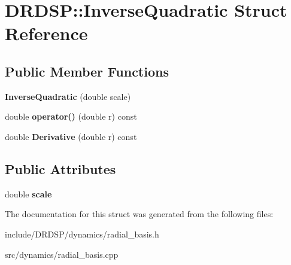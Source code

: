 \hypertarget{struct_d_r_d_s_p_1_1_inverse_quadratic}{\section{D\-R\-D\-S\-P\-:\-:Inverse\-Quadratic Struct Reference}
\label{struct_d_r_d_s_p_1_1_inverse_quadratic}
}
\subsection*{Public Member Functions}
\begin{DoxyCompactItemize}
\item 
\hypertarget{struct_d_r_d_s_p_1_1_inverse_quadratic_a4a7714fcbafbaec4bb30c6922feb59e1}{{\bfseries Inverse\-Quadratic} (double scale)}\label{struct_d_r_d_s_p_1_1_inverse_quadratic_a4a7714fcbafbaec4bb30c6922feb59e1}

\item 
\hypertarget{struct_d_r_d_s_p_1_1_inverse_quadratic_a8046e278ab0c485750ff062c6862ec87}{double {\bfseries operator()} (double r) const }\label{struct_d_r_d_s_p_1_1_inverse_quadratic_a8046e278ab0c485750ff062c6862ec87}

\item 
\hypertarget{struct_d_r_d_s_p_1_1_inverse_quadratic_a628c78a421c55898e94846eeb1865326}{double {\bfseries Derivative} (double r) const }\label{struct_d_r_d_s_p_1_1_inverse_quadratic_a628c78a421c55898e94846eeb1865326}

\end{DoxyCompactItemize}
\subsection*{Public Attributes}
\begin{DoxyCompactItemize}
\item 
\hypertarget{struct_d_r_d_s_p_1_1_inverse_quadratic_a31241ecd1ec571b651307d29e6b69c07}{double {\bfseries scale}}\label{struct_d_r_d_s_p_1_1_inverse_quadratic_a31241ecd1ec571b651307d29e6b69c07}

\end{DoxyCompactItemize}


The documentation for this struct was generated from the following files\-:\begin{DoxyCompactItemize}
\item 
include/\-D\-R\-D\-S\-P/dynamics/radial\-\_\-basis.\-h\item 
src/dynamics/radial\-\_\-basis.\-cpp\end{DoxyCompactItemize}
